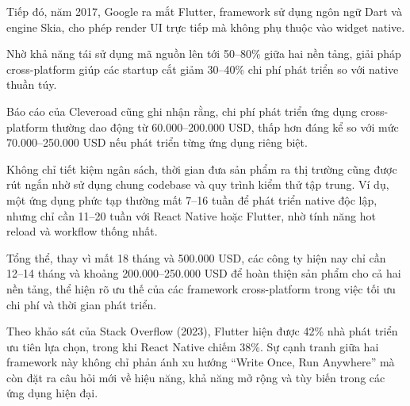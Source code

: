 \begin{flushleft}
    \hspace*{0.8cm}Tiếp đó, năm 2017, Google ra mắt Flutter, framework sử dụng ngôn ngữ Dart và engine Skia, cho phép render UI trực tiếp mà không phụ thuộc vào widget native.
\end{flushleft}

\begin{flushleft}
    \hspace*{0.8cm}Nhờ khả năng tái sử dụng mã nguồn lên tới 50--80\% giữa hai nền tảng, giải pháp cross-platform giúp các startup cắt giảm 30--40\% chi phí phát triển so với native thuần túy.
\end{flushleft}

\begin{flushleft}
    \hspace*{0.8cm}Báo cáo của Cleveroad cũng ghi nhận rằng, chi phí phát triển ứng dụng cross-platform thường dao động từ 60.000--200.000 USD, thấp hơn đáng kể so với mức 70.000--250.000 USD nếu phát triển từng ứng dụng riêng biệt.
\end{flushleft}

\begin{flushleft}
    \hspace*{0.8cm}Không chỉ tiết kiệm ngân sách, thời gian đưa sản phẩm ra thị trường cũng được rút ngắn nhờ sử dụng chung codebase và quy trình kiểm thử tập trung. Ví dụ, một ứng dụng phức tạp thường mất 7--16 tuần để phát triển native độc lập, nhưng chỉ cần 11--20 tuần với React Native hoặc Flutter, nhờ tính năng hot reload và workflow thống nhất.
\end{flushleft}

\begin{flushleft}
    \hspace*{0.8cm}Tổng thể, thay vì mất 18 tháng và 500.000 USD, các công ty hiện nay chỉ cần 12--14 tháng và khoảng 200.000--250.000 USD để hoàn thiện sản phẩm cho cả hai nền tảng, thể hiện rõ ưu thế của các framework cross-platform trong việc tối ưu chi phí và thời gian phát triển.
\end{flushleft}

\begin{flushleft}
    \hspace*{0.8cm}Theo khảo sát của Stack Overflow (2023), Flutter hiện được 42\% nhà phát triển ưu tiên lựa chọn, trong khi React Native chiếm 38\%. Sự cạnh tranh giữa hai framework này không chỉ phản ánh xu hướng ``Write Once, Run Anywhere'' mà còn đặt ra câu hỏi mới về hiệu năng, khả năng mở rộng và tùy biến trong các ứng dụng hiện đại.
\end{flushleft}


